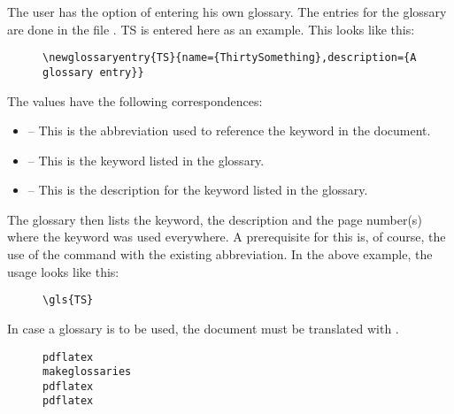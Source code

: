 The user has the option of entering his own glossary. The entries for the
glossary are done in the file . \gls{TS}
is entered here as an example. This looks like this:

\begin{figure}[H]
    \scriptsize
    \centering
    \begin{BVerbatim}
\newglossaryentry{TS}{name={ThirtySomething},description={A glossary entry}}
    \end{BVerbatim}
\end{figure}

The values have the following correspondences:

\begin{itemize}
    \item {} -- This is the abbreviation used to reference the
          keyword in the document.
    \item {} -- This is the keyword listed in the
          glossary.
    \item {} -- This is the description for the
          keyword listed in the glossary.
\end{itemize}

The glossary then lists the keyword, the description and the page number(s)
where the keyword was used everywhere. A prerequisite for this is, of course,
the use of the command  with
the existing abbreviation. In the above example, the usage looks like this:

\begin{figure}[H]
    \small
    \centering
    \begin{BVerbatim}
\gls{TS}
    \end{BVerbatim}
\end{figure}

In case a glossary is to be used, the document must be translated with
.

\begin{figure}[H]
    \small
    \centering
    \begin{BVerbatim}
pdflatex
makeglossaries
pdflatex
pdflatex
    \end{BVerbatim}
\end{figure}

